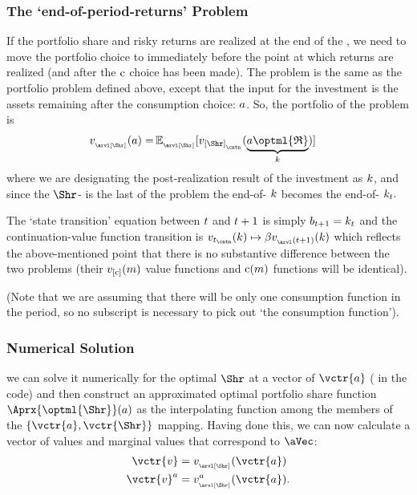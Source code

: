 \documentclass[\econtexRoot/SolvingMicroDSOPs]{subfiles}
\begin{document}
\subsubsection{The `end-of-period-returns' Problem}

If the portfolio share and risky returns are realized at the end of the {\interval}, we need to move the portfolio choice {\stg} to immediately before the point at which returns are realized (and after the $\mathrm{c}$ choice has been made).  The problem is the same as the portfolio problem defined above, except that the input for the investment {\stg} is the assets remaining after the consumption choice: $a$.  So, the portfolio {\stg} of the problem is
\begin{equation}\begin{gathered}\begin{aligned}
  \vFunc_{_\arvl[\Shr]}(\aNrm) = & \Ex_{_\arvl[\Shr]}[\vFunc_{[\Shr]_{_\cntn}}(\underbrace{\aNrm\optml{\Rport}}_{\kNrm})] %
    \end{aligned}\end{gathered}\end{equation}
where we are designating the post-realization result of the investment as $k$, and since the $\Shr$-{\stg} is the last {\stg} of the problem the end-of-{\stg} $k$ becomes the end-of-{\interval} $k_{t}.$ 

The `state transition' equation between $t$ and $t+1$ is simply $b_{t+1} = k_{t}$ and the continuation-value function transition is $\vFunc_{\prd_\cntn}(\kNrm) \mapsto \DiscFac \vFunc_{_\arvl(\prd+1)}(\kNrm)$ which reflects the above-mentioned point that there is no substantive difference between the two problems (their $v_{[\mathrm{c}]}(m)$ value functions and $\mathrm{c}(m)$ functions will be identical).

(Note that we are assuming that there will be only one consumption function in the period, so no {\stg} subscript is necessary to pick out `the consumption function'). 

\subsubsection{Numerical Solution}
we can solve it numerically for the optimal $\Shr$ at a vector of $\vctr{a}$ ({\aVecCode} in the code)  and then construct an approximated optimal portfolio share function $\Aprx{\optml{\Shr}}(a)$ as the interpolating function among the members of the $\{\vctr{a},\vctr{\Shr}\}$ mapping.  Having done this, we can now calculate a vector of values and marginal values that correspond to $\aVec$:
\begin{equation}\begin{gathered}\begin{aligned}
      \vctr{v}  & = \vFunc_{_\arvl[\Shr]}(\vctr{a}) \label{eq:vShrEnd}
\\      \vctr{v}^\aNrm  & = \vFunc^{\aNrm}_{_\arvl[\Shr]}(\vctr{a}).
    \end{aligned}\end{gathered}\end{equation}
\end{document}

